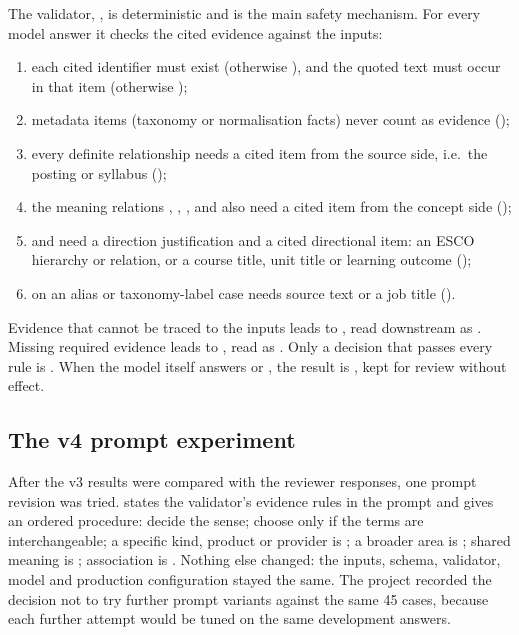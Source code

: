 The validator, , is deterministic and is the main safety mechanism. For every model answer it checks the cited evidence against the inputs:
\begin{enumerate}
    \item each cited identifier must exist (otherwise ), and the quoted text must occur in that item (otherwise );
    \item metadata items (taxonomy or normalisation facts) never count as evidence ();
    \item every definite relationship needs a cited item from the source side, i.e.\ the posting or syllabus ();
    \item the meaning relations \SC, \PA, \CH, \RE{} and \PO{} also need a cited item from the concept side ();
    \item \PA{} and \CH{} need a direction justification and a cited directional item: an ESCO hierarchy or relation, or a course title, unit title or learning outcome ();
    \item \SC{} on an alias or taxonomy-label case needs source text or a job title ().
\end{enumerate}
Evidence that cannot be traced to the inputs leads to , read downstream as \AM. Missing required evidence leads to , read as \IE. Only a decision that passes every rule is . When the model itself answers \AM{} or \IE, the result is , kept for review without effect.

\subsection{The v4 prompt experiment}

After the v3 results were compared with the reviewer responses, one prompt revision was tried.  states the validator's evidence rules in the prompt and gives an ordered procedure: decide the sense; choose \SC{} only if the terms are interchangeable; a specific kind, product or provider is \CH; a broader area is \PA; shared meaning is \PO; association is \RE. Nothing else changed: the inputs, schema, validator, model and production configuration stayed the same. The project recorded the decision not to try further prompt variants against the same 45 cases, because each further attempt would be tuned on the same development answers.

